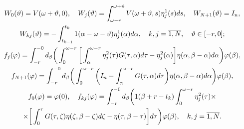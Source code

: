 \begin{gather}


W_{0}(\vartheta) =V(\omega+ \vartheta,0),


\quad W_{j}(\vartheta) = \int_{\omega-r}^{\omega+ \vartheta}


V(\omega+ \vartheta,s)


\eta_{j}^{1}(s) ds, \quad W_{N+1}(\vartheta) =I_{n},\notag\\


%


W_{kj}(\vartheta) = - \int_{t_{k-1} }^{t_{k} } 1(\alpha- \omega-\vartheta)


\eta_{j}^{1}(\alpha) d \alpha,


\quad k,j= \overline{1,N}, \quad \vartheta \in[-r,0]; \\


%


f_{j}(\varphi) = \int_{-r}^{-0}d_{\beta}


\bigg(\int_{0}^{\omega-r}\bigg[\int_{\alpha}^{\omega-r} \eta_{j}^{2}(\tau)


G(\tau, \alpha) d \tau- \eta_{j}^{2}(\alpha)\bigg] \eta(\alpha, \beta- \alpha)


d \alpha\bigg) \varphi(\beta), \notag \\


%


f_{N+1}(\varphi) = \int_{-r}^{-0}d_{\beta}


\bigg(\int_{0}^{\omega-r}\bigg(I_{n}


- \int_{\alpha}^{\omega -r} G(\tau, \alpha)


d \tau\bigg) \eta(\alpha, \beta- \alpha) d \alpha\bigg)


\varphi(\beta), \notag \\


%


f_{0}(\varphi) = \varphi(0),\quad f_{kj}(\varphi) =


\int_{-r}^{-0}d_{\beta}\bigg(1(\beta+r-t_{k})


\int_{0}^{\omega-r} \eta_{j}^{2}(\tau) \times \notag \\


\times \bigg[\int_{0}^{\tau}G(\tau, \zeta)


\eta(\zeta, \beta- \zeta) d \zeta- \eta(\tau, \beta- \tau)\bigg] d \tau\bigg)


\varphi(\beta), \quad k,j= \overline{1,N}.\notag


\end{gather}





